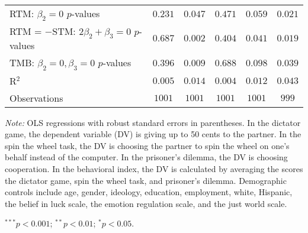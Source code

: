 \begin{table}[!t]
\begin{center}
{\begin{threeparttable}
\begin{tabular}{l c c c c c}
RTM: $\beta_2 = 0$ $p$-values                   & $0.231$        & $0.047$       & $0.471$       & $0.059$   & $0.021$     \\
RTM = $-$STM: $2\beta_2+\beta_3 = 0$ $p$-values & $0.687$        & $0.002$       & $0.404$       & $0.041$   & $0.019$     \\
TMB: $\beta_2 = 0, \beta_3 = 0$ $p$-values      & $0.396$        & $0.009$       & $0.688$       & $0.098$   & $0.039$     \\
R$^2$                                           & $0.005$        & $0.014$       & $0.004$       & $0.012$   & $0.043$     \\
Observations                                    & $1001$         & $1001$        & $1001$        & $1001$    & $999$       \\
\bottomrule
\end{tabular}
\begin{tablenotes}[flushleft]
\scriptsize{\item[\hspace{-5mm}] \textit{Note:} OLS regressions with robust standard errors in parentheses. 
                                In the dictator game, the dependent variable (DV) is giving up to 50 cents to the partner. 
                                In the spin the wheel task, the DV is choosing the partner to spin the wheel on one’s behalf instead of the computer. 
                                In the prisoner’s dilemma, the DV is choosing cooperation. 
                                In the behavioral index, the DV is calculated by averaging the scores the dictator game, spin the wheel task, and prisoner's dilemma.
                                Demographic controls include age, gender, ideology,
                                education, employment, white, Hispanic, the belief in luck scale, the emotion regulation scale, and the just world scale. \item[\hspace{-5mm}] $^{***}p<0.001$; $^{**}p<0.01$; $^{*}p<0.05$.}
\end{tablenotes}
\end{threeparttable}
}
\label{tab:behavior_unrelated_regression}
\end{center}
\end{table}

\renewcommand{\baselinestretch}{1.67}%
